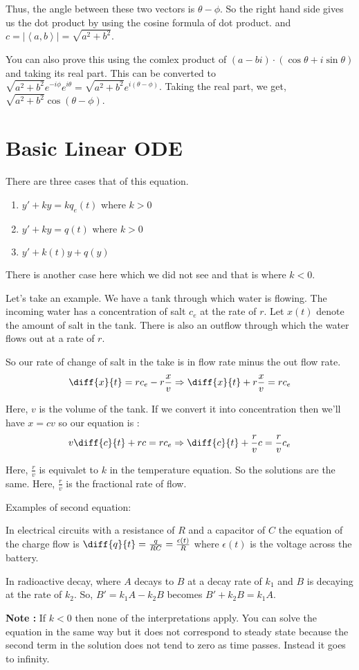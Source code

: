 Thus, the angle between these two vectors is $\theta - \phi$. So the right hand side gives us the dot product by using the cosine formula of dot product.
and $c = |\left< a, b \right>| = \sqrt{a^2 + b^2}$.

You can also prove this using the comlex product of $(a-bi)\cdot(\cos \theta + i \sin \theta)$ and taking its real part.
This can be converted to $\sqrt{a^2+b^2} e^{-i\phi} e^{i\theta} = \sqrt{a^2 + b^2} e^{i(\theta - \phi)}$.
Taking the real part, we get, $\sqrt{a^2 + b^2} \cos (\theta - \phi)$.

\pagebreak

\section{Basic Linear ODE}

There are three cases that of this equation.

\begin{enumerate}
    \item $y' + ky = kq_e(t)$ where $k > 0$
    \item $y' + ky = q(t)$ where $k > 0$
    \item $y' + k(t)y + q(y)$
\end{enumerate}

There is another case here which we did not see and that is where $k < 0$.

Let's take an example. We have a tank through which water is flowing.
The incoming water has a concentration of salt $c_e$ at the rate of $r$.
Let $x(t)$ denote the amount of salt in the tank.
There is also an outflow through which the water flows out at a rate of $r$.

So our rate of change of salt in the take is in flow rate minus the out flow rate.
$$ \diff{x}{t} = rc_e - r\frac{x}{v} \Rightarrow \diff{x}{t} + r\frac{x}{v} = rc_e $$

Here, $v$ is the volume of the tank. 
If we convert it into concentration then we'll have $x = cv$ so our equation is :
$$ v \diff{c}{t} + rc = rc_e \Rightarrow \diff{c}{t} + \frac{r}{v} c = \frac{r}{v} c_e $$ 

Here, $\frac{r}{v}$ is equivalet to $k$ in the temperature equation. 
So the solutions are the same. Here, $\frac{r}{v}$ is the fractional rate of flow.

Examples of second equation:

In electrical circuits with a resistance of $R$ and a capacitor of $C$ the equation of the charge flow is $\diff{q}{t} = \frac{q}{RC} = \frac{\epsilon(t)}{R}$ where $\epsilon(t)$ is the voltage across the battery.

In radioactive decay, where $A$ decays to $B$ at a decay rate of $k_1$ and $B$ is decaying at the rate of $k_2$.
So, $B' = k_1A - k_2B$ becomes $B' + k_2B = k_1A$.

{\bf Note : } If $k < 0$ then none of the interpretations apply.
You can solve the equation in the same way but it does not correspond to steady state
because the second term in the solution does not tend to zero as time passes. Instead it goes to infinity.